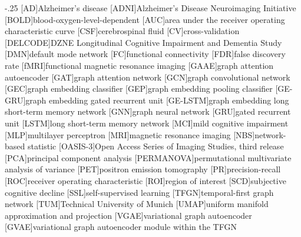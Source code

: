 \documentclass[headsepline,footsepline,footinclude=false,oneside,fontsize=11pt,paper=a4,listof=totoc,bibliography=totoc]{scrbook} %
\begin{document}


\frontmatter{}


% 


\tableofcontents{}

\mainmatter{}










\appendix{}




\begin{acronym}
	\itemsep-.25\baselineskip
	[AD]{Alzheimer's disease}
	[ADNI]{Alzheimer's Disease Neuroimaging Initiative}
	[BOLD]{blood-oxygen-level-dependent}
	[AUC]{area under the receiver operating characteristic curve}
	[CSF]{cerebrospinal fluid}
	[CV]{cross-validation}
	[DELCODE]{DZNE Longitudinal Cognitive Impairment and Dementia Study}
	[DMN]{default mode network}
	[FC]{functional connectivity}
	[FDR]{false discovery rate}
	[fMRI]{functional magnetic resonance imaging}
	[GAAE]{graph attention autoencoder}
	[GAT]{graph attention network}
	[GCN]{graph convolutional network}
	[GEC]{graph embedding classifier}
	[GEP]{graph embedding pooling classifier}
	[GE-GRU]{graph embedding gated recurrent unit}
	[GE-LSTM]{graph embedding long short-term memory network}
	[GNN]{graph neural network}
	[GRU]{gated recurrent unit}
	[LSTM]{long short-term memory network}
	[MCI]{mild cognitive impairment}
	[MLP]{multilayer perceptron}
	[MRI]{magnetic resonance imaging}
	[NBS]{network-based statistic}
	[OASIS-3]{Open Access Series of Imaging Studies, third release}
	[PCA]{principal component analysis}
	[PERMANOVA]{permutational multivariate analysis of variance}
	[PET]{positron emission tomography}
	[PR]{precision-recall}
	[ROC]{receiver operating characteristic}
	[ROI]{region of interest}
	[SCD]{subjective cognitive decline}
	[SSL]{self-supervised learning}
	[TFGN]{temporal-first graph network}
	[TUM]{Technical University of Munich}
	[UMAP]{uniform manifold approximation and projection}
	[VGAE]{variational graph autoencoder}
	[GVAE]{variational graph autoencoder module within the TFGN}
\end{acronym}

\listoffigures{}
\listoftables{}
\printbibliography{}
\end{document}
